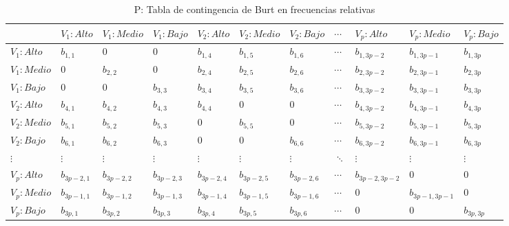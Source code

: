 \documentclass[mathematics,article,submit,moreauthors,pdftex]{mdpi}
\begin{document}
\begin{table}[!ht]
\begin{center}
 \begin{tabular}{| p{1.7cm} ||p{1cm}p{1cm}p{1cm}||p{1cm}p{1cm} p{1cm} ||p{1cm} ||p{1.3cm} p{1cm} p{1cm} ||} 
 \hline
  & $V_{1}:Alto$ &$V_{1}:Medio$ &$V_{1}:Bajo$ & $V_{2}:Alto$ & $V_{2}:Medio$ & $V_{2}:Bajo$ & $\cdots$ & $V_{p}:Alto$ & $V_{p}:Medio$ & $V_{p}:Bajo$ \\ [0.5ex] 
 \hline\hline
 $V_{1}:Alto$ & $b_{1,1}$ & 0 & 0  & $b_{1,4}$ & $b_{1,5}$ & $b_{1,6}$ & $\cdots$ & $b_{1,3p-2}$ & $b_{1,3p-1}$ & $b_{1,3p}$ \\
 $V_{1}:Medio$ & 0 & $b_{2,2}$ & 0 & $b_{2,4}$ & $b_{2,5}$ & $b_{2,6}$ & $\cdots$ & $b_{2,3p-2}$ & $b_{2,3p-1}$ & $b_{2,3p}$ \\ 
 $V_{1}:Bajo$ & 0 & 0 & $b_{3,3}$  & $b_{3,4}$ & $b_{3,5}$ & $b_{3,6}$ & $\cdots$ & $b_{3,3p-2}$ & $b_{3,3p-1}$ & $b_{3,3p}$ \\ 
\hline\hline
  $V_{2}:Alto$ & $b_{4,1}$ & $b_{4,2}$ & $b_{4,3}$ & $b_{4,4}$ & 0 & 0 & $\cdots$ & $b_{4,3p-2}$ & $b_{4,3p-1}$ & $b_{4,3p}$ \\
 $V_{2}:Medio$ & $b_{5,1}$ & $b_{5,2}$ & $b_{5,3}$ & 0 & $b_{5,5}$ & 0 & $\cdots$ & $b_{5,3p-2}$ & $b_{5,3p-1}$ & $b_{5,3p}$ \\ 
 $V_{2}:Bajo$ &  $b_{6,1}$ & $b_{6,2}$ & $b_{6,3}$ & 0 & 0 &  $b_{6,6}$ & $\cdots$& $b_{6,3p-2}$ & $b_{6,3p-1}$ & $b_{6,3p}$ \\ 
\hline\hline
 
 $\vdots$ & $\vdots$ & $\vdots$ & $\vdots$ & $\vdots$ & $\vdots$ & $\vdots$ & $\ddots$ & $\vdots$ & $\vdots$ & $\vdots$ \\ 
 
\hline\hline
 $V_{p}:Alto$  & $b_{3p-2,1}$   & $b_{3p-2,2}$   & $b_{3p-2,3}$   & $b_{3p-2,4}$   & $b_{3p-2,5}$   & $b_{3p-2,6}$    & $\cdots$ & $b_{3p-2,3p-2}$ & 0 & 0 \\
 $V_{p}:Medio$ & $b_{3p-1,1}$ & $b_{3p-1,2}$ & $b_{3p-1,3}$ & $b_{3p-1,4}$ & $b_{3p-1,5}$ & $b_{3p-1,6}$  & $\cdots$ & 0 & $b_{3p-1,3p-1}$ & 0 \\ 
 $V_{p}:Bajo$  & $b_{3p,1}$ & $b_{3p,2}$ & $b_{3p,3}$ & $b_{3p,4}$ & $b_{3p,5}$ & $b_{3p,6}$  & $\cdots$ & 0 & 0 & $b_{3p,3p}$ \\ 
\hline
\end{tabular}
\caption{P: Tabla de contingencia de Burt en frecuencias relativas}
\label{tab:p}
\end{center}
\end{table}
\end{document}
